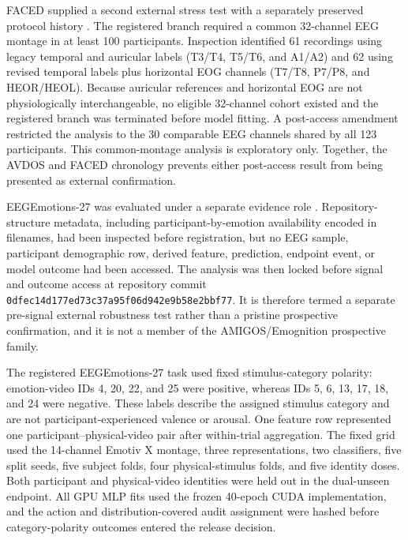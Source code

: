 \documentclass[preprint,12pt]{elsarticle}
\begin{document}
FACED supplied a second external stress test with a separately preserved protocol history \cite{chen2023faced}. The registered branch required a common 32-channel EEG montage in at least 100 participants. Inspection identified 61 recordings using legacy temporal and auricular labels (T3/T4, T5/T6, and A1/A2) and 62 using revised temporal labels plus horizontal EOG channels (T7/T8, P7/P8, and HEOR/HEOL). Because auricular references and horizontal EOG are not physiologically interchangeable, no eligible 32-channel cohort existed and the registered branch was terminated before model fitting. A post-access amendment restricted the analysis to the 30 comparable EEG channels shared by all 123 participants. This common-montage analysis is exploratory only. Together, the AVDOS and FACED chronology prevents either post-access result from being presented as external confirmation.

EEGEmotions-27 was evaluated under a separate evidence role \cite{huytung2025eegemotions}. Repository-structure metadata, including participant-by-emotion availability encoded in filenames, had been inspected before registration, but no EEG sample, participant demographic row, derived feature, prediction, endpoint event, or model outcome had been accessed. The analysis was then locked before signal and outcome access at repository commit \texttt{0dfec14d177ed73c37a95f06d942e9b58e2bbf77}. It is therefore termed a separate pre-signal external robustness test rather than a pristine prospective confirmation, and it is not a member of the AMIGOS/Emognition prospective family.

The registered EEGEmotions-27 task used fixed stimulus-category polarity: emotion-video IDs 4, 20, 22, and 25 were positive, whereas IDs 5, 6, 13, 17, 18, and 24 were negative. These labels describe the assigned stimulus category and are not participant-experienced valence or arousal. One feature row represented one participant--physical-video pair after within-trial aggregation. The fixed grid used the 14-channel Emotiv X montage, three representations, two classifiers, five split seeds, five subject folds, four physical-stimulus folds, and five identity doses. Both participant and physical-video identities were held out in the dual-unseen endpoint. All GPU MLP fits used the frozen 40-epoch CUDA implementation, and the action and distribution-covered audit assignment were hashed before category-polarity outcomes entered the release decision.
\end{document}
